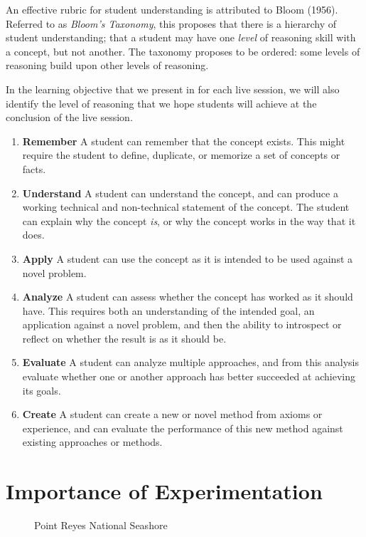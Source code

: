\documentclass[
]{article}
\makeatletter
\newcommand*\pandocbounded[1]{%
  \sbox\pandoc@box{#1}%
  \Gscale@div\@tempa{\textheight}{\dimexpr\ht\pandoc@box+\dp\pandoc@box\relax}%
  \Gscale@div\@tempb{\linewidth}{\wd\pandoc@box}%
  \ifdim\@tempb\p@<\@tempa\p@\let\@tempa\@tempb\fi%
  \ifdim\@tempa\p@<\p@\scalebox{\@tempa}{\usebox\pandoc@box}%
  \else\usebox{\pandoc@box}%
  \fi%
}
\providecommand{\tightlist}{%
  \setlength{\itemsep}{0pt}\setlength{\parskip}{0pt}}
\theoremstyle{definition}
\theoremstyle{definition}
\theoremstyle{definition}
\theoremstyle{definition}
\theoremstyle{remark}
\makeatother
\begin{document}
An effective rubric for student understanding is attributed to Bloom (1956). Referred to as \emph{Bloom's Taxonomy}, this proposes that there is a hierarchy of student understanding; that a student may have one \emph{level} of reasoning skill with a concept, but not another. The taxonomy proposes to be ordered: some levels of reasoning build upon other levels of reasoning.

In the learning objective that we present in for each live session, we will also identify the level of reasoning that we hope students will achieve at the conclusion of the live session.

\begin{enumerate}
\def\labelenumi{\arabic{enumi}.}
\tightlist
\item
  \textbf{Remember} A student can remember that the concept exists. This might require the student to define, duplicate, or memorize a set of concepts or facts.
\item
  \textbf{Understand} A student can understand the concept, and can produce a working technical and non-technical statement of the concept. The student can explain why the concept \emph{is}, or why the concept works in the way that it does.
\item
  \textbf{Apply} A student can use the concept as it is intended to be used against a novel problem.
\item
  \textbf{Analyze} A student can assess whether the concept has worked as it should have. This requires both an understanding of the intended goal, an application against a novel problem, and then the ability to introspect or reflect on whether the result is as it should be.
\item
  \textbf{Evaluate} A student can analyze multiple approaches, and from this analysis evaluate whether one or another approach has better succeeded at achieving its goals.
\item
  \textbf{Create} A student can create a new or novel method from axioms or experience, and can evaluate the performance of this new method against existing approaches or methods.
\end{enumerate}

\section{Importance of Experimentation}\label{importance-of-experimentation}

\begin{figure}
\centering
\pandocbounded{\texttt{[image: ./images/point\_reyes.jpg]}}
\caption{Point Reyes National Seashore}
\end{figure}
\end{document}
